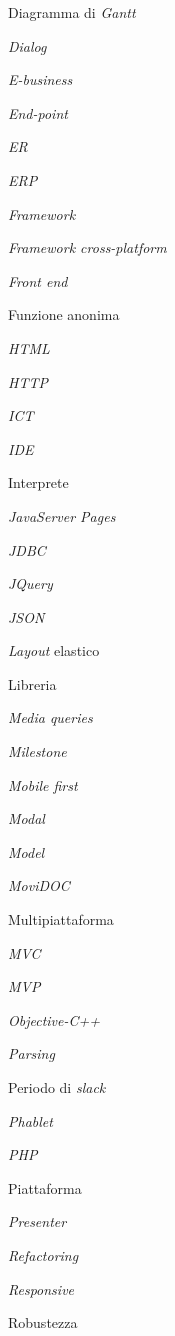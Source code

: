 \begin{enumerate}[label={[\arabic*]}]
	\item Diagramma di \textit{Gantt} 
	\item \textit{Dialog} 
	\item \textit{E-business} 
	\item \textit{End-point} 
	\item \textit{ER} 
	\item \textit{ERP} 
	\item \textit{Framework} 
	\item \textit{Framework cross-platform} 
	\item \textit{Front end} 
	\item Funzione anonima 
	\item \textit{HTML} 
	\item \textit{HTTP} 
	\item \textit{ICT} 
	\item \textit{IDE} 
	\item Interprete 
	\item \textit{JavaServer Pages} 
	\item \textit{JDBC}
	\item \textit{JQuery} 
	\item \textit{JSON} 
	\item \textit{Layout} elastico
	\item Libreria 
	\item \textit{Media queries} 
	\item \textit{Milestone} 
	\item \textit{Mobile first} 
	\item \textit{Modal} 
	\item \textit{Model} 
	\item \textit{MoviDOC} 
	\item Multipiattaforma 
	\item \textit{MVC} 
	\item \textit{MVP} 
	\item \textit{Objective-C++} 
	\item \textit{Parsing}
	\item Periodo di \textit{slack} 
	\item \textit{Phablet} 
	\item \textit{PHP} 
	\item Piattaforma
	\item \textit{Presenter}
	\item \textit{Refactoring} 
	\item \textit{Responsive} 
	\item Robustezza 

\end{enumerate}

